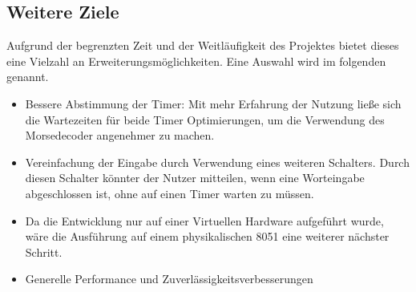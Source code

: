 \documentclass[a4paper,12pt]{article}
\begin{document}
	\subsection{Weitere Ziele}
	Aufgrund der begrenzten Zeit und der Weitläufigkeit des Projektes bietet dieses eine Vielzahl an Erweiterungsmöglichkeiten. Eine Auswahl wird im folgenden genannt.\\
	\begin{itemize}
		\item Bessere Abstimmung der Timer: Mit mehr Erfahrung der Nutzung ließe sich die Wartezeiten für beide Timer Optimierungen, um die Verwendung des Morsedecoder angenehmer zu machen.
		\item Vereinfachung der Eingabe durch Verwendung eines weiteren Schalters. Durch diesen Schalter könnter der Nutzer mitteilen, wenn eine Worteingabe abgeschlossen ist, ohne auf einen Timer warten zu müssen.
		\item Da die Entwicklung nur auf einer Virtuellen Hardware aufgeführt wurde, wäre die Ausführung auf einem physikalischen 8051 eine weiterer nächster Schritt.
		\item Generelle Performance und Zuverlässigkeitsverbesserungen
	\end{itemize}
	
	
\end{document}
